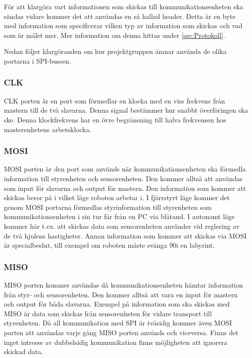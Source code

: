 För att klargöra vart informationen som skickas till kommunikationsenheten ska sändas vidare kommer det att användas en så kallad header. Detta är en byte med information som specificerar vilken typ av information som skickas och vad som är målet mer. Mer information om denna hittas under \ref{sec:Protokoll}.

Nedan följer klargöranden om hur projektgruppen ämnar använda de olika portarna i SPI-bussen. 


\subsubsection{CLK}

CLK porten är en port som förmedlar en klocka med en viss frekvens från mastern till de två slavarna. Denna signal bestämmer hur snabbt överföringen ska ske. Denna klockfrekvens har en övre begränsning till halva frekvensen hos masterenhetens arbetsklocka.


\subsubsection{MOSI}
MOSI porten är den port som används när kommunikationsenheten ska förmedla
information till styrenheten och sensorenheten. Den kommer alltså att användas som
input för slavarna och output för mastern. Den information som kommer att
skickas beror på i vilket läge roboten arbetar i. I fjärrstyrt läge kommer det
genom MOSI portarna förmedlas styrinformation till styrenheten som
kommunikationsenheten i sin tur får från en PC via blåtand. I autonomt läge
kommer här t.ex. att skickas data som sensorenheten använder vid
reglering av de två hjulens hastigheter. Annan information som kommer att skickas via MOSI är
specialbeslut, till exempel om roboten måste svänga 90\degree i en labyrint.

\subsubsection{MISO}
MISO porten kommer användas då kommunikationsenheten hämtar information från styr- och sensorenheten. Den kommer alltså att vara en input för mastern och output för båda slavarna. Exempel på information som ska skickas med MISO är data som skickas från sensorenheten för vidare transport till styrenheten.
Då all kommunikation med SPI är tvåsidig kommer även MOSI porten att användas varje gång MISO porten används och viceversa. Finns det inget intresse av dubbelsidig kommunikation finns möjligheten att ignorera skickad data.

